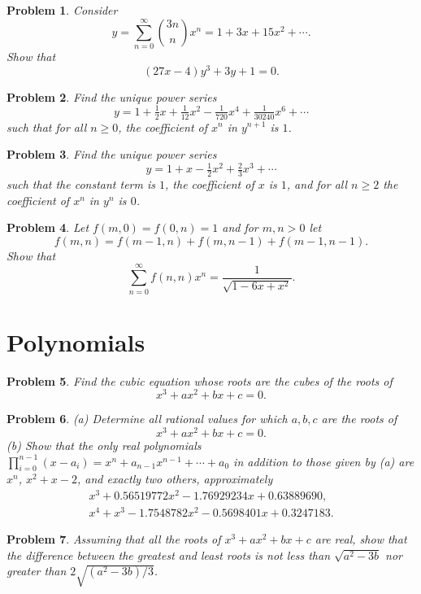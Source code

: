 \documentclass[12pt]{article}
\newtheorem{problem}{Problem}
\begin{document}
\begin{problem}
Consider
\[
y = \sum_{n=0}^\infty \binom{3n}{n} x^n = 1 + 3x + 15x^2 + \cdots.
\]
Show that
\[
(27x-4)y^3 + 3y + 1 = 0.
\]
\end{problem}

\begin{problem}
Find the unique power series
\[
y = 1 + \tfrac{1}{2}x + \tfrac{1}{12}x^2 - \tfrac{1}{720}x^4 + \tfrac{1}{30240}x^6 + \cdots
\]
such that for all $n \geq 0$, the coefficient of $x^n$ in $y^{n+1}$ is $1$.
\end{problem}

\begin{problem}
Find the unique power series
\[
y = 1 + x - \tfrac{1}{2}x^2 + \tfrac{2}{3}x^3 + \cdots
\]
such that the constant term is $1$, the coefficient of $x$ is $1$, and for all $n \geq 2$ the coefficient of $x^n$ in $y^n$ is $0$.
\end{problem}

\begin{problem}
Let $f(m,0)=f(0,n)=1$ and for $m,n > 0$ let
\[
f(m,n) = f(m-1,n) + f(m,n-1) + f(m-1,n-1).
\]
Show that
\[
\sum_{n=0}^\infty f(n,n)x^n = \frac{1}{\sqrt{1-6x+x^2}}.
\]
\end{problem}

\section*{Polynomials}

\begin{problem}
Find the cubic equation whose roots are the cubes of the roots of
\[
x^3 + ax^2 + bx + c = 0.
\]
\end{problem}

\begin{problem}
(a) Determine all rational values for which $a, b, c$ are the roots of
\[
x^3 + ax^2 + bx + c = 0.
\]
(b) Show that the only real polynomials $\prod_{i=0}^{n-1} (x-a_i) = x^n + a_{n-1}x^{n-1} + \cdots + a_0$ in addition to those given by (a) are $x^n$, $x^2+x-2$, and exactly two others, approximately
\begin{align*}
x^3 + 0.56519772x^2 - 1.76929234x + 0.63889690, \\
x^4 + x^3 - 1.7548782x^2 - 0.5698401x + 0.3247183.
\end{align*}
\end{problem}

\begin{problem}
Assuming that all the roots of $x^3 + ax^2 + bx + c$ are real, show that the difference between the greatest and least roots is not less than $\sqrt{a^2-3b}$ nor greater than $2\sqrt{(a^2-3b)/3}$.
\end{problem}
\end{document}
